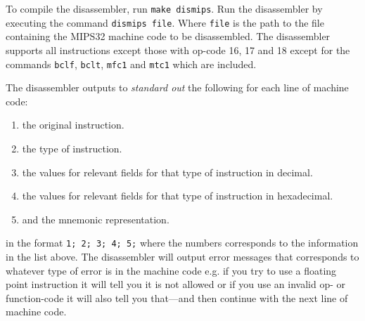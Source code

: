 To compile the disassembler, run \texttt{make dismips}.
Run the disassembler by executing the command \texttt{dismips file}.
Where \texttt{file} is the path to the file containing the MIPS32 machine code to be disassembled.
The disassembler supports all instructions except those with op-code 16, 17 and 18 except for the commands
\texttt{bclf}, \texttt{bclt}, \texttt{mfc1} and \texttt{mtc1} which are included.

The disassembler outputs to \emph{standard out} the following for each line of machine code:
\begin{enumerate}
\item the original instruction.
\item the type of instruction.
\item the values for relevant fields for that type of instruction in decimal.
\item the values for relevant fields for that type of instruction in hexadecimal.
\item and the mnemonic representation.
\end{enumerate}
in the format \texttt{1; 2; 3; 4; 5;} where the numbers corresponds to the information in the list above.
The disassembler will output error messages that corresponds to whatever type of error is in the machine code e.g. if you try to use a floating point instruction it will tell you it is not allowed or if you use an invalid op- or function-code it will also tell you that---and then continue with the next line of machine code.